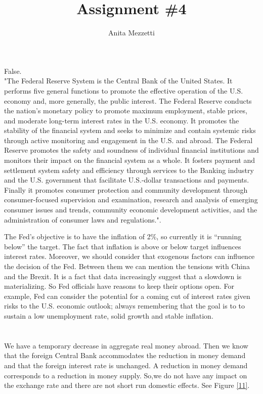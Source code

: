 \documentclass[	11pt, ]{fphw}
\title{Assignment \#4} %
\author{Anita Mezzetti}
\institute{École polytechnique fédérale de Lausanne}
\begin{document}
\maketitle 
\section{}
False. \\
"The Federal Reserve System is the Central Bank of the United States. It performs five general functions to promote the effective operation of the U.S. economy and, more generally, the public interest. The Federal Reserve conducts the nation’s monetary policy to promote maximum employment, stable prices, and moderate long-term interest rates in the U.S. economy. It promotes the stability of the financial system and seeks to minimize and contain systemic risks through active monitoring and engagement in the U.S. and abroad. The Federal Reserve promotes the safety and soundness of individual financial institutions and monitors their impact on the financial system as a whole. It fosters payment and settlement system safety and efficiency through services to the Banking industry and the U.S. government that facilitate U.S.-dollar transactions and payments. Finally it promotes consumer protection and community development through consumer-focused supervision and examination, research and analysis of emerging consumer issues and trends, community economic development activities, and the administration of consumer laws and regulations.". \cite{res}
\par 
The Fed's objective is to have the inflation of 2$\%$, so currently it is “running below” the target. The fact that inflation is above or below target influences interest rates.
Moreover, we should consider that exogenous factors can influence the decision of the Fed. Between them we can mention the tensions with China and the Brexit. It is a fact that data increasingly suggest that a slowdown is materializing. So Fed officials have reasons to keep their options open. For example, Fed can consider the potential for a coming cut of interest rates given risks to the U.S. economic outlook; always remembering that the goal is to to sustain a low unemployment rate, solid growth and stable inflation. 
\newpage
\section{}
\subsection{}
We have a temporary decrease in aggregate real money abroad. Then we know that the foreign Central Bank accommodates the reduction in money demand and that the foreign interest rate is unchanged. A reduction in money demand corresponds to a reduction in money supply. So,we do not have any impact on the exchange rate and there are not short run domestic effects. See Figure \vref{11}.
\end{document}
